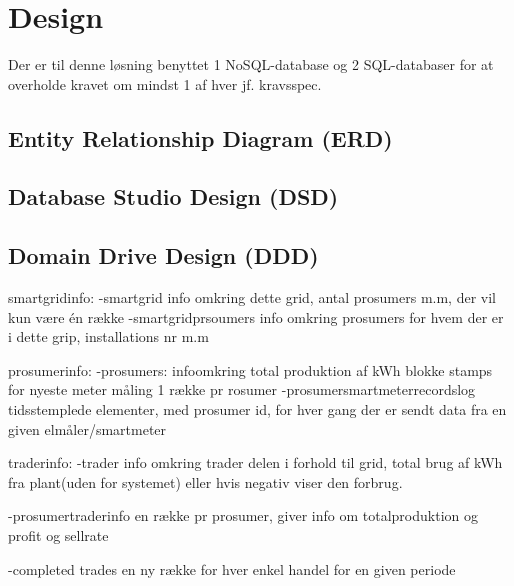 
\section{Design}

Der er til denne løsning benyttet 1 NoSQL-database og 2 SQL-databaser for at overholde kravet om mindst 1 af hver jf. kravsspec.

\subsection{Entity Relationship Diagram (ERD)}

\subsection{Database Studio Design (DSD)}

\subsection{Domain Drive Design (DDD)}





smartgridinfo:
-smartgrid
    info omkring dette grid, antal prosumers m.m, der vil kun være én række
-smartgridprsoumers
    info omkring prosumers for hvem der er i dette grip, installations nr m.m

prosumerinfo:
-prosumers:
    infoomkring total produktion af kWh blokke
    stamps for nyeste meter måling 1 række pr rosumer
-prosumersmartmeterrecordslog
    tidsstemplede elementer, med prosumer id, for hver gang der er sendt data fra en given elmåler/smartmeter


traderinfo:
-trader
    info omkring trader delen i forhold til grid, total brug af kWh fra plant(uden for systemet) eller hvis negativ viser den forbrug. 

-prosumertraderinfo
    en række pr prosumer, giver info om totalproduktion og profit og sellrate

-completed trades
    en ny række for hver enkel handel for en given periode
